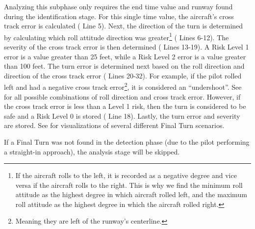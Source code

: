             Analyzing this subphase only requires the end time value and runway found during the identification stage.  For this single time value, the aircraft's cross track error is calculated ( Line 5).  Next, the direction of the turn is determined by calculating which roll attitude direction was greater\footnote{If the aircraft rolls to the left, it is recorded as a negative degree and vice versa if the aircraft rolls to the right.  This is why we find the minimum roll attitude as the highest degree in which aircraft rolled left, and the maximum roll attitude as the highest degree in which the aircraft rolled right.} ( Lines 6-12).  The severity of the cross track error is then determined ( Lines 13-19).  A Risk Level 1 error is a value greater than 25 feet, while a Risk Level 2 error is a value greater than 100 feet.  The turn error is determined next based on the roll direction and direction of the cross track error ( Lines 20-32).  For example, if the pilot rolled left and had a negative cross track error\footnote{Meaning they are left of the runway's centerline.}, it is considered an ``undershoot''.  See  for all possible combinations of roll direction and cross track error.  However, if the cross track error is less than a Level 1 risk, then the turn is considered to be safe and a Risk Level 0 is stored ( Line 18).  Lastly, the turn error and severity are stored.  See  for visualizations of several different Final Turn scenarios.
            
            If a Final Turn was not found in the detection phase (due to the pilot performing a straight-in approach), the analysis stage will be skipped.
            

